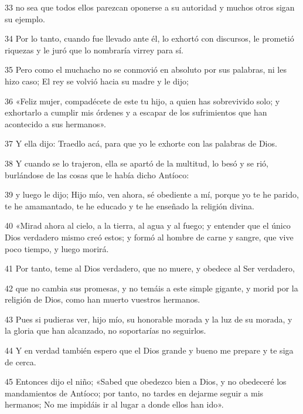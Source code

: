 \par 33 no sea que todos ellos parezcan oponerse a su autoridad y muchos otros sigan su ejemplo.

\par 34 Por lo tanto, cuando fue llevado ante él, lo exhortó con discursos, le prometió riquezas y le juró que lo nombraría virrey para sí.

\par 35 Pero como el muchacho no se conmovió en absoluto por sus palabras, ni les hizo caso; El rey se volvió hacia su madre y le dijo;

\par 36 «Feliz mujer, compadécete de este tu hijo, a quien has sobrevivido solo; y exhortarlo a cumplir mis órdenes y a escapar de los sufrimientos que han acontecido a sus hermanos».

\par 37 Y ella dijo: Traedlo acá, para que yo le exhorte con las palabras de Dios.

\par 38 Y cuando se lo trajeron, ella se apartó de la multitud, lo besó y se rió, burlándose de las cosas que le había dicho Antíoco:

\par 39 y luego le dijo; Hijo mío, ven ahora, sé obediente a mí, porque yo te he parido, te he amamantado, te he educado y te he enseñado la religión divina.

\par 40 «Mirad ahora al cielo, a la tierra, al agua y al fuego; y entender que el único Dios verdadero mismo creó estos; y formó al hombre de carne y sangre, que vive poco tiempo, y luego morirá.

\par 41 Por tanto, teme al Dios verdadero, que no muere, y obedece al Ser verdadero,

\par 42 que no cambia sus promesas, y no temáis a este simple gigante, y morid por la religión de Dios, como han muerto vuestros hermanos.

\par 43 Pues si pudieras ver, hijo mío, su honorable morada y la luz de su morada, y la gloria que han alcanzado, no soportarías no seguirlos.

\par 44 Y en verdad también espero que el Dios grande y bueno me prepare y te siga de cerca.

\par 45 Entonces dijo el niño; «Sabed que obedezco bien a Dios, y no obedeceré los mandamientos de Antíoco; por tanto, no tardes en dejarme seguir a mis hermanos; No me impidáis ir al lugar a donde ellos han ido».

